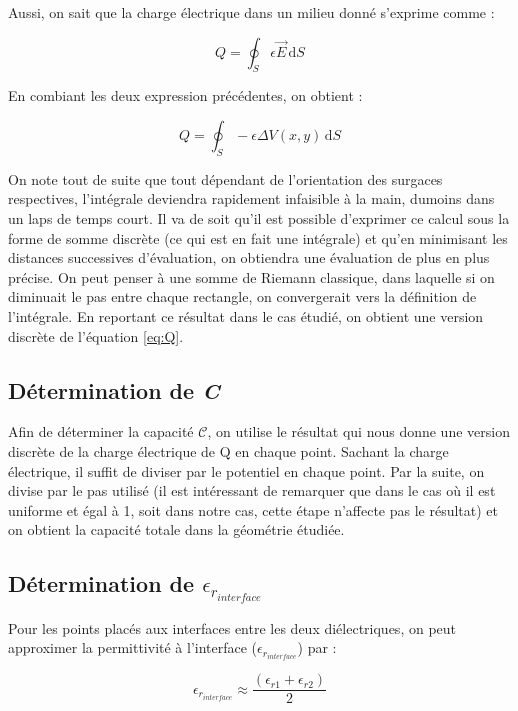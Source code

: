 Aussi, on sait que la charge électrique dans un milieu donné s'exprime comme : 

\begin{equation}
	Q = \oint_S \! \epsilon \vec{E} \, \mathrm{d}S
\end{equation}

En combiant les deux expression précédentes, on obtient : 

\begin{equation}
	\label{eq:Q}
	Q = \oint_S \! -\epsilon \Delta V(x,y) \, \mathrm{d}S
\end{equation}

On note tout de suite que tout dépendant de l'orientation des surgaces respectives, l'intégrale deviendra rapidement infaisible à la main, dumoins dans un laps de temps court. Il va de soit qu'il est possible d'exprimer ce calcul sous la forme de somme discrète (ce qui est en fait une intégrale) et qu'en minimisant les distances successives d'évaluation, on obtiendra une évaluation de plus en plus précise. On peut penser à une somme de Riemann classique, dans laquelle si on diminuait le pas entre chaque rectangle, on convergerait vers la définition de l'intégrale. En reportant ce résultat dans le cas étudié, on obtient une version discrète de l'équation \ref{eq:Q}.

\subsection{Détermination de \textit{C}}
Afin de déterminer la capacité $\mathcal{C}$, on utilise le résultat qui nous donne une version discrète de la charge électrique de Q en chaque point. Sachant la charge électrique, il suffit de diviser par le potentiel en chaque point. Par la suite, on divise par le pas utilisé (il est intéressant de remarquer que dans le cas où il est uniforme et égal à 1, soit dans notre cas, cette étape n'affecte pas le résultat) et on obtient la capacité totale dans la géométrie étudiée.

\subsection{Détermination de $\epsilon_{r_{interface}}$}
Pour les points placés aux interfaces entre les deux diélectriques, on peut approximer la permittivité à l'interface ($\epsilon_{r_{interface}}$) par : 

\begin{equation}
	\epsilon_{r_{interface}} \approx \frac{ (\epsilon_{r1}+\epsilon_{r2})}{2}
\end{equation}

